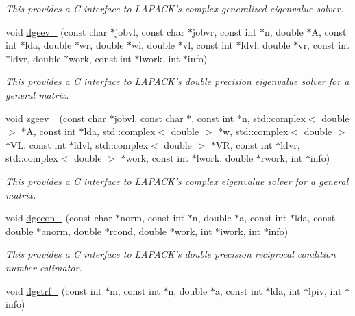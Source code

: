\begin{DoxyCompactItemize}
\begin{DoxyCompactList}\small\item\em This provides a C interface to L\-A\-P\-A\-C\-K's complex generalized eigenvalue solver. \end{DoxyCompactList}\item 
\hypertarget{namespacekeycpp_aebc5253e80ac15a9bfdc5449ae4f972a}{void \hyperlink{namespacekeycpp_aebc5253e80ac15a9bfdc5449ae4f972a}{dgeev\-\_\-} (const char $\ast$jobvl, const char $\ast$jobvr, const int $\ast$n, double $\ast$A, const int $\ast$lda, double $\ast$wr, double $\ast$wi, double $\ast$vl, const int $\ast$ldvl, double $\ast$vr, const int $\ast$ldvr, double $\ast$work, const int $\ast$lwork, int $\ast$info)}\label{namespacekeycpp_aebc5253e80ac15a9bfdc5449ae4f972a}

\begin{DoxyCompactList}\small\item\em This provides a C interface to L\-A\-P\-A\-C\-K's double precision eigenvalue solver for a general matrix. \end{DoxyCompactList}\item 
\hypertarget{namespacekeycpp_a8c1cca2a162f40fc6c6218c35cadf9f2}{void \hyperlink{namespacekeycpp_a8c1cca2a162f40fc6c6218c35cadf9f2}{zgeev\-\_\-} (const char $\ast$jobvl, const char $\ast$, const int $\ast$n, std\-::complex$<$ double $>$ $\ast$A, const int $\ast$lda, std\-::complex$<$ double $>$ $\ast$w, std\-::complex$<$ double $>$ $\ast$V\-L, const int $\ast$ldvl, std\-::complex$<$ double $>$ $\ast$V\-R, const int $\ast$ldvr, std\-::complex$<$ double $>$ $\ast$work, const int $\ast$lwork, double $\ast$rwork, int $\ast$info)}\label{namespacekeycpp_a8c1cca2a162f40fc6c6218c35cadf9f2}

\begin{DoxyCompactList}\small\item\em This provides a C interface to L\-A\-P\-A\-C\-K's complex eigenvalue solver for a general matrix. \end{DoxyCompactList}\item 
\hypertarget{namespacekeycpp_aca3be6524e195662cbb74a810305e721}{void \hyperlink{namespacekeycpp_aca3be6524e195662cbb74a810305e721}{dgecon\-\_\-} (const char $\ast$norm, const int $\ast$n, double $\ast$a, const int $\ast$lda, const double $\ast$anorm, double $\ast$rcond, double $\ast$work, int $\ast$iwork, int $\ast$info)}\label{namespacekeycpp_aca3be6524e195662cbb74a810305e721}

\begin{DoxyCompactList}\small\item\em This provides a C interface to L\-A\-P\-A\-C\-K's double precision reciprocal condition number estimator. \end{DoxyCompactList}\item 
\hypertarget{namespacekeycpp_a75e334ffaf1864d7191e9e0b64189783}{void \hyperlink{namespacekeycpp_a75e334ffaf1864d7191e9e0b64189783}{dgetrf\-\_\-} (const int $\ast$m, const int $\ast$n, double $\ast$a, const int $\ast$lda, int $\ast$lpiv, int $\ast$info)}\label{namespacekeycpp_a75e334ffaf1864d7191e9e0b64189783}


\end{DoxyCompactItemize}
